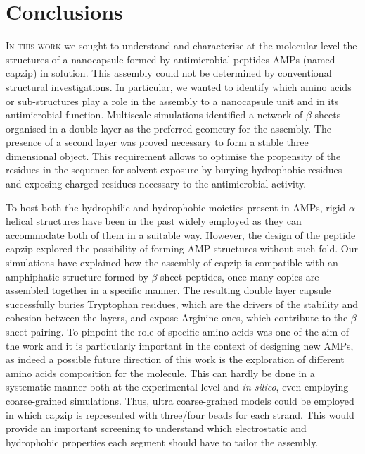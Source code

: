 \chapter{Conclusions} \label{chapter:concl}

\lettrine{I}{n this work} we sought to understand and characterise at the molecular level the structures of a nanocapsule formed by antimicrobial peptides AMPs (named capzip) in solution. This assembly could not be determined by conventional structural investigations. In particular, we wanted to identify which amino acids or sub-structures play a role in the assembly to a nanocapsule unit and in its antimicrobial function.
%
Multiscale simulations identified a network of $\beta$-sheets organised in a double layer as the preferred geometry for the assembly. The presence of a second layer was proved necessary to form a stable three dimensional object.
%
This requirement allows to optimise the propensity of the residues in the sequence for solvent exposure by burying hydrophobic residues and exposing charged residues necessary to the antimicrobial activity.

To host both the hydrophilic and hydrophobic moieties present in AMPs, rigid $\alpha$-helical structures have been in the past widely employed as they can accommodate both of them in a suitable way. However, the design of the peptide capzip explored the possibility of forming AMP structures without such fold. Our simulations have explained how the assembly of capzip is compatible with an amphiphatic structure formed by $\beta$-sheet peptides, once many copies are assembled together in a specific manner.
%
The resulting double layer capsule successfully buries Tryptophan residues, which are the drivers of the stability and cohesion between the layers, and expose Arginine ones, which contribute to the $\beta$-sheet pairing.
%
To pinpoint the role of specific amino acids was one of the aim of the work and it is particularly important in the context of designing new AMPs, as indeed a possible future direction of this work is the exploration of different amino acids composition for the molecule. This can hardly be done in a systematic manner both at the experimental level and \emph{in silico}, even employing coarse-grained simulations. Thus, ultra coarse-grained models could be employed in which capzip is represented with three/four beads for each strand. This would provide an important screening to understand which electrostatic and hydrophobic properties each segment should have to tailor the assembly.

